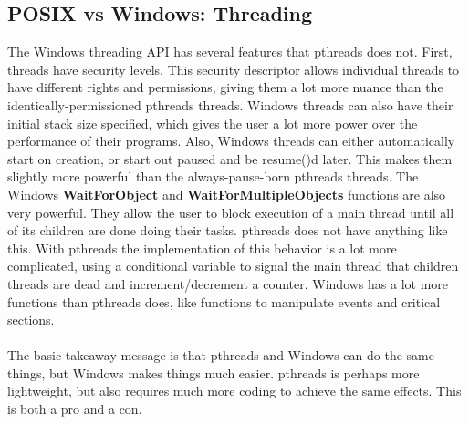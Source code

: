 \documentclass[11pt]{article}
\begin{document}
\subsection{POSIX vs Windows: Threading}
The Windows threading API has several features that pthreads does not. First, threads have security levels. This security descriptor allows individual threads to have different rights and permissions, giving them a lot more nuance than the identically-permissioned pthreads threads. Windows threads can also have their initial stack size specified, which gives the user a lot more power over the performance of their programs. Also, Windows threads can either automatically start on creation, or start out paused and be resume()d later. This makes them slightly more powerful than the always-pause-born pthreads threads. The Windows \textbf{WaitForObject} and \textbf{WaitForMultipleObjects} functions are also very powerful. They allow the user to block execution of a main thread until all of its children are done doing their tasks. pthreads does not have anything like this. With pthreads the implementation of this behavior is a lot more complicated, using a conditional variable to signal the main thread that children threads are dead and increment/decrement a counter. Windows has a lot more functions than pthreads does, like functions to manipulate events and critical sections. \\ \\
The basic takeaway message is that pthreads and Windows can do the same things, but Windows makes things much easier. pthreads is perhaps more lightweight, but also requires much more coding to achieve the same effects. This is both a pro and a con. \\
\end{document}
